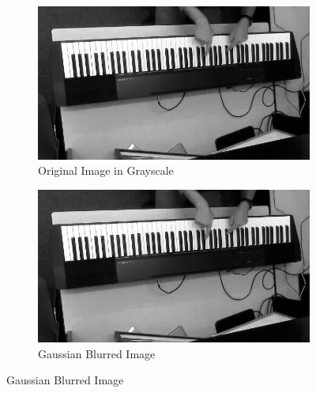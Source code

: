 \documentclass[10pt,twocolumn,letterpaper]{article}
\begin{document}
\begin{figure}[h!]
  \begin{subfigure}{0.24\textwidth}
  \includegraphics[width=\linewidth]{fig/1.jpg}
  \caption{Original Image in Grayscale} \label{fig:a}
  \end{subfigure}\hspace*{\fill}
  \begin{subfigure}{0.24\textwidth}
  \includegraphics[width=\linewidth]{fig/2.jpg}
  \caption{Gaussian Blurred Image} \label{fig:b}
  \end{subfigure}
  

\end{figure}
\end{document}
